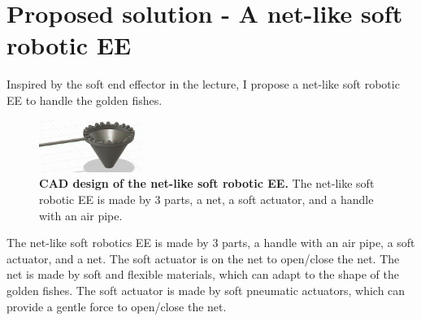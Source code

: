 \documentclass{article}
\begin{document}
\section*{Proposed solution - A net-like soft robotic EE}
Inspired by the soft end effector in the lecture, I propose a net-like soft robotic EE to handle the golden fishes.
\begin{figure}
    \centering
    \includegraphics[width=0.3\textwidth]{assets/net_ee.png}
    \caption{\textbf{CAD design of the net-like soft robotic EE.} The net-like soft robotic EE is made by 3 parts, a net, a soft actuator, and a handle with an air pipe.}
\end{figure}

The net-like soft robotics EE is made by 3 parts, a handle with an air pipe, a soft actuator, and a net. The soft actuator is on the net to open/close the net.
The net is made by soft and flexible materials, which can adapt to the shape of the golden fishes.
The soft actuator is made by soft pneumatic actuators, which can provide a gentle force to open/close the net. 
\end{document}
